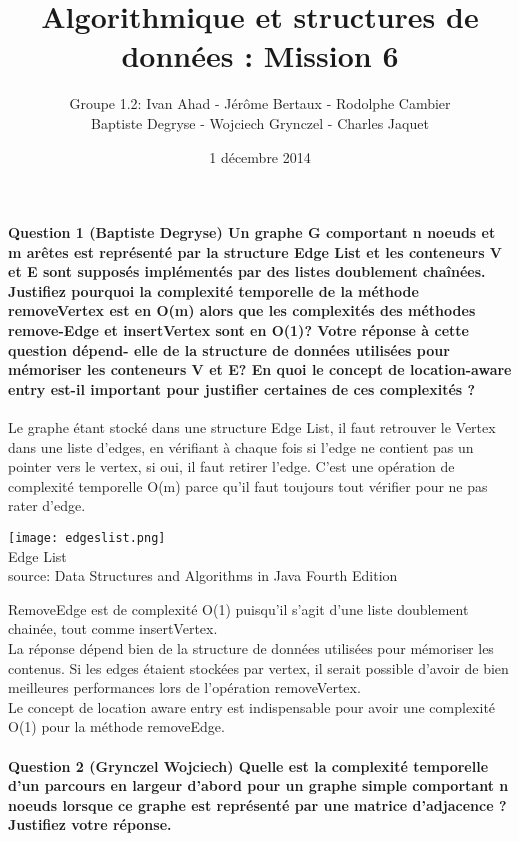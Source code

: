 \documentclass[a4paper]{article}
\title{Algorithmique et structures de données : Mission 6}
\date{1 décembre 2014}
\author{Groupe 1.2: Ivan Ahad - Jérôme Bertaux - Rodolphe Cambier \\ 
	Baptiste Degryse - Wojciech Grynczel - Charles Jaquet}
\begin{document}
\maketitle
\paragraph{Question 1 (Baptiste Degryse)   Un graphe G comportant n noeuds et m arêtes est représenté par la structure Edge List
et les conteneurs V et E sont supposés implémentés par des listes doublement chaînées. Justifiez pourquoi la complexité temporelle de la méthode removeVertex est en O(m) alors que les complexités des méthodes remove-Edge et insertVertex sont en O(1)? Votre réponse à cette question dépend-
elle de la structure de données utilisées pour mémoriser les conteneurs
V et E? En quoi le concept de
location-aware entry
est-il important pour justifier certaines
de ces complexités ?}
Le graphe étant stocké dans une structure Edge List, il faut retrouver le Vertex dans une liste d'edges, en vérifiant à chaque fois si l'edge ne contient pas un pointer vers le vertex, si oui, il faut retirer l'edge. C'est une opération de complexité temporelle O(m) parce qu'il faut toujours tout vérifier pour ne pas rater d'edge.\\
\begin{center}
\texttt{[image: edgeslist.png]}\\
Edge List\\
source: Data Structures and Algorithms in Java Fourth Edition
\end{center}
RemoveEdge est de complexité O(1) puisqu'il s'agit d'une liste doublement chainée, tout comme insertVertex.\\

La réponse dépend bien de la structure de données utilisées pour mémoriser les contenus. Si les edges étaient stockées par vertex, il serait possible d'avoir de bien meilleures performances lors de l'opération removeVertex.\\

Le concept de location aware entry est indispensable pour avoir une complexité O(1) pour la méthode removeEdge.

\paragraph{Question 2 (Grynczel Wojciech) Quelle est la complexité temporelle d’un parcours en largeur d’abord pour un	graphe simple comportant n noeuds lorsque ce graphe est représenté par une matrice d’adjacence ? Justifiez votre réponse.\\}
\end{document}
